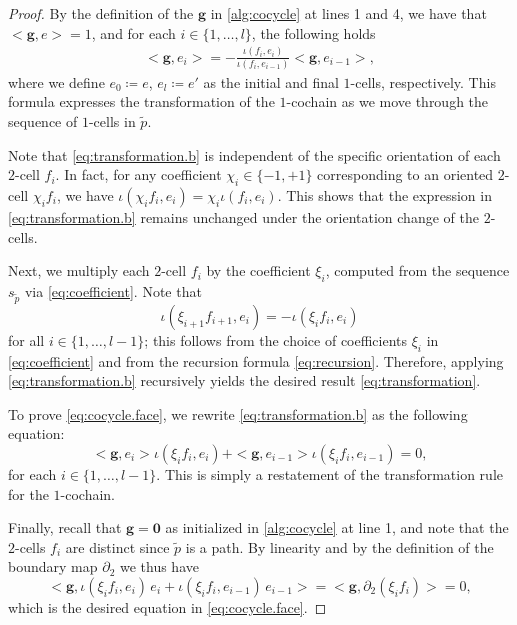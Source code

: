 \documentclass[a4paper,twoside,10pt]{article}
\theoremstyle{plain}
\theoremstyle{definition}
\theoremstyle{remark}
\newcommand{\inner}[2]{< #1,#2>}
\newcommand{\cochain}[1]{\mathbf #1}
\newcommand{\dual}[1]{\tilde{#1}}
\begin{document}
\begin{proof}
By the definition of the $\cochain g$ in \cref{alg:cocycle} at lines 1 and 4, we have that $\inner{\cochain g}{e}=1$, and for each $i \in \{1, \dots, l\}$, the following holds
\begin{align}
\inner{\cochain g}{e_{i}} = -\frac{\iota(f_{i},e_{i})}{\iota(f_{i}, e_{i-1})} \inner{\cochain g}{e_{i-1}},
\label{eq:transformation.b}
\end{align}
where we define $e_0\coloneqq e$, $e_l \coloneqq e'$ as the initial and final $1$-cells, respectively.
This formula expresses the transformation of the $1$-cochain as we move through the sequence of $1$-cells in $\dual p$.

Note that \cref{eq:transformation.b} is independent of the specific orientation of each $2$-cell $f_i$.
In fact, for any coefficient $\chi_i \in \{-1, +1\}$ corresponding to an oriented $2$-cell $\chi_i f_i$, we have $\iota(\chi_i f_i,e_{i}) = \chi_i \iota(f_i,e_{i})$.
This shows that the expression in \cref{eq:transformation.b} remains unchanged under the orientation change of the $2$-cells.

Next, we multiply each $2$-cell $f_i$ by the coefficient $\xi_i$, computed from the sequence $s_{\dual p}$ via \cref{eq:coefficient}.
Note that
\[
\iota(\xi_{i+1} f_{i+1},e_i) = -\iota(\xi_i f_i,e_i)
\]
for all $i\in\{1,\dots,l-1\}$; this follows from the choice of coefficients $\xi_i$ in \cref{eq:coefficient} and from the recursion formula \cref{eq:recursion}.
Therefore, applying \cref{eq:transformation.b} recursively yields the desired result \cref{eq:transformation}.

To prove \cref{eq:cocycle.face}, we rewrite \cref{eq:transformation.b} as the following equation:
\begin{equation*}
\inner{\cochain g}{e_i} \iota(\xi_i f_{i},e_i) + \inner{\cochain g}{e_{i-1}} \iota(\xi_i f_{i}, e_{i-1}) = 0,
\end{equation*}
for each $i \in \{1, \dots, l-1\}$.
This is simply a restatement of the transformation rule for the $1$-cochain.

Finally, recall that $\cochain g = \cochain 0$ as initialized in \cref{alg:cocycle} at line 1, and note that the $2$-cells $f_i$ are distinct since $\dual p$ is a path.
By linearity and by the definition of the boundary map $\partial_{2}$ we thus have
\[
\inner{\cochain g}{\iota(\xi_i f_{i},e_i)\,e_i + \iota(\xi_i f_{i}, e_{i-1})\,e_{i-1}}
= \inner{\cochain g}{\partial_2(\xi_i f_i)} = 0,
\]
which is the desired equation in \cref{eq:cocycle.face}.
\end{proof}
\end{document}
